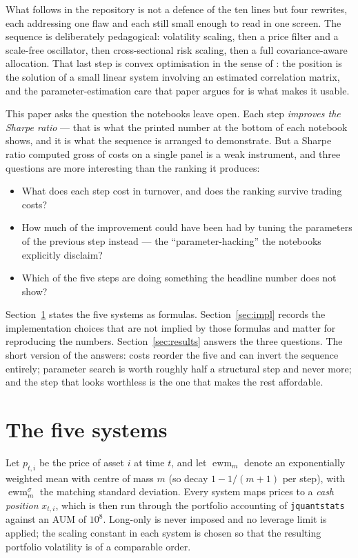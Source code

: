 \documentclass[11pt,a4paper]{article}
\newcommand{\code}[1]{\texttt{#1}}
\DeclareMathOperator{\ewm}{ewm}
\begin{document}
What follows in the repository is not a defence of the ten lines but four
rewrites, each addressing one flaw and each still small enough to read in one
screen. The sequence is deliberately pedagogical: volatility scaling, then a
price filter and a scale-free oscillator, then cross-sectional risk scaling,
then a full covariance-aware allocation. That last step is convex
optimisation in the sense of \citet{schmelzer2013}: the position is the
solution of a small linear system involving an estimated correlation matrix,
and the parameter-estimation care that paper argues for is what makes it
usable.

This paper asks the question the notebooks leave open. Each step
\emph{improves the Sharpe ratio} --- that is what the printed number at the
bottom of each notebook shows, and it is what the sequence is arranged to
demonstrate. But a Sharpe ratio computed gross of costs on a single panel is
a weak instrument, and three questions are more interesting than the ranking
it produces:

\begin{itemize}
  \item What does each step cost in turnover, and does the ranking survive
        trading costs?
  \item How much of the improvement could have been had by tuning the
        parameters of the previous step instead --- the
        ``parameter-hacking'' the notebooks explicitly disclaim?
  \item Which of the five steps are doing something the headline number does
        not show?
\end{itemize}

Section~\ref{sec:method} states the five systems as formulas.
Section~\ref{sec:impl} records the implementation choices that are not implied
by those formulas and matter for reproducing the numbers.
Section~\ref{sec:results} answers the three questions. The short version of
the answers: costs reorder the five and can invert the sequence entirely;
parameter search is worth roughly half a structural step and never more; and
the step that looks worthless is the one that makes the rest affordable.

\section{The five systems}
\label{sec:method}

Let $p_{t,i}$ be the price of asset $i$ at time $t$, and let
$\ewm_m$ denote an exponentially weighted mean with centre of mass
$m$ (so decay $1 - 1/(m+1)$ per step), with $\ewm^{\sigma}_m$ the
matching standard deviation. Every system maps prices to a \emph{cash
position} $x_{t,i}$, which is then run through the portfolio accounting of
\code{jquantstats} against an AUM of $10^8$. Long-only is never imposed and
no leverage limit is applied; the scaling constant in each system is chosen so
that the resulting portfolio volatility is of a comparable order.
\end{document}
